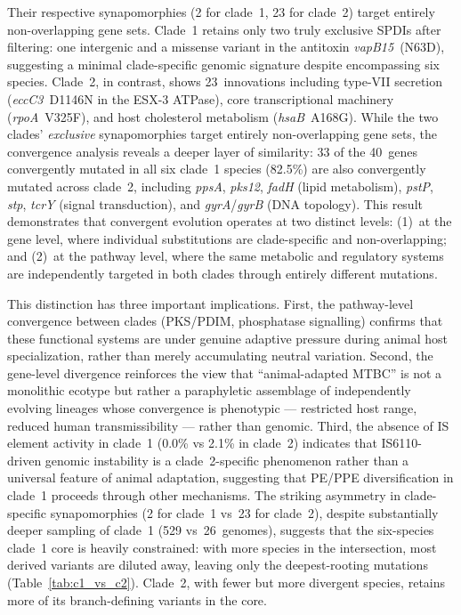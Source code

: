 \documentclass[11pt,a4paper]{article}
\begin{document}
Their respective synapomorphies (2 for clade~1, 23 for clade~2) target
entirely non-overlapping gene sets.
%
Clade~1 retains only two truly exclusive SPDIs after filtering: one intergenic
and a missense variant in the antitoxin \textit{vapB15}~(N63D), suggesting a
minimal clade-specific genomic signature despite encompassing six species.
%
Clade~2, in contrast, shows 23~innovations including type-VII secretion
(\textit{eccC3}~D1146N in the ESX-3 ATPase), core transcriptional machinery
(\textit{rpoA}~V325F), and host cholesterol metabolism (\textit{hsaB}~A168G).
%
While the two clades' \emph{exclusive} synapomorphies target entirely
non-overlapping gene sets, the convergence analysis reveals a deeper layer
of similarity: 33 of the 40~genes convergently mutated in all six clade~1
species (82.5\%) are also convergently mutated across clade~2, including
\textit{ppsA}, \textit{pks12}, \textit{fadH} (lipid metabolism),
\textit{pstP}, \textit{stp}, \textit{tcrY} (signal transduction), and
\textit{gyrA}/\textit{gyrB} (DNA topology).
%
This result demonstrates that convergent evolution operates at two distinct
levels: (1)~at the gene level, where individual substitutions are
clade-specific and non-overlapping; and (2)~at the pathway level, where
the same metabolic and regulatory systems are independently targeted in
both clades through entirely different mutations.

This distinction has three important implications.
%
First, the pathway-level convergence between clades (PKS/PDIM, phosphatase
signalling) confirms that these functional systems are under genuine
adaptive pressure during animal host specialization, rather than merely
accumulating neutral variation.
%
Second, the gene-level divergence reinforces the view that ``animal-adapted
MTBC'' is not a monolithic ecotype but rather a paraphyletic assemblage of
independently evolving lineages whose convergence is phenotypic --- restricted
host range, reduced human transmissibility --- rather than genomic.
%
Third, the absence of IS element activity in clade~1 (0.0\% vs 2.1\% in
clade~2) indicates that IS6110-driven genomic instability is a
clade~2-specific phenomenon rather than a universal feature of animal
adaptation, suggesting that PE/PPE diversification in clade~1 proceeds
through other mechanisms.
%
The striking asymmetry in clade-specific synapomorphies (2 for clade~1 vs~23
for clade~2), despite substantially deeper sampling of clade~1
(529 vs~26~genomes), suggests that the six-species clade~1 core is heavily
constrained: with more species in the intersection, most derived variants
are diluted away, leaving only the deepest-rooting mutations (Table~\ref{tab:c1_vs_c2}).
%
Clade~2, with fewer but more divergent species, retains more of its
branch-defining variants in the core.
\end{document}
